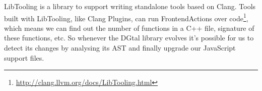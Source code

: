 LibTooling is a library to support writing standalone tools based on Clang. Tools built with LibTooling, like Clang Plugins, can run FrontendActions over code\footnote{\url{http://clang.llvm.org/docs/LibTooling.html}}, which means we can find out the number of functions in a C++ file, signature of these functions, etc. So whenever the DGtal library evolves it's possible for us to detect its changes by analysing its AST and finally upgrade our JavaScript support files.



